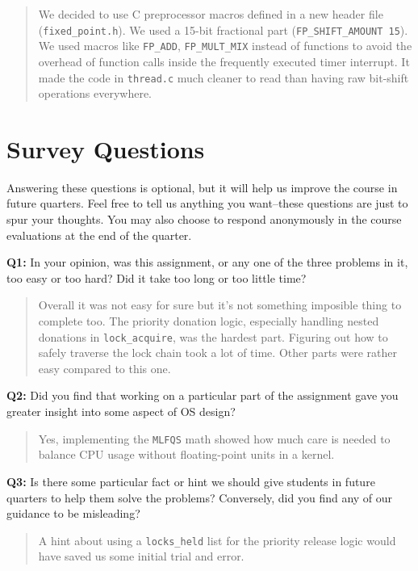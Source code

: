 \documentclass[a4paper,11pt]{paper}
\begin{document}
\begin{quote}
  We decided to use C preprocessor macros defined in a new header file (\texttt{fixed\_point.h}). We used a 15-bit fractional part (\texttt{FP\_SHIFT\_AMOUNT 15}). We used macros like \texttt{FP\_ADD}, \texttt{FP\_MULT\_MIX} instead of functions to avoid the overhead of function calls inside the frequently executed timer interrupt. It made the code in \texttt{thread.c} much cleaner to read than having raw bit-shift operations everywhere.
\end{quote}

\section{Survey Questions}

Answering these questions is optional, but it will help us improve the course in future quarters.  Feel free to tell us anything you want--these questions are just to spur your thoughts.  You may also choose to respond anonymously in the course evaluations at the end of the quarter.

\textbf{Q1:} In your opinion, was this assignment, or any one of the three
problems in it, too easy or too hard?  Did it take too long or too little time?

\begin{quote}
  Overall it was not easy for sure but it's not something imposible thing to complete too. The priority donation logic, especially handling nested donations in \texttt{lock\_acquire}, was the hardest part. Figuring out how to safely traverse the lock chain took a lot of time. Other parts were rather easy compared to this one. 
\end{quote}

\textbf{Q2:} Did you find that working on a particular part of the assignment
gave you greater insight into some aspect of OS design?

\begin{quote}
  Yes, implementing the \texttt{MLFQS} math showed how much care is needed to balance CPU usage without floating-point units in a kernel.
\end{quote}

\textbf{Q3:} Is there some particular fact or hint we should give students in
future quarters to help them solve the problems?  Conversely, did you find any
of our guidance to be misleading?

\begin{quote}
  A hint about using a \texttt{locks\_held} list for the priority release logic would have saved us some initial trial and error.
\end{quote}
\end{document}
